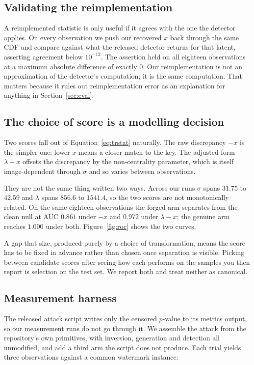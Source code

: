 \documentclass[10pt,twocolumn]{article}
\newcommand{\xstat}{\ensuremath{x}}
\newcommand{\lam}{\ensuremath{\lambda}}
\begin{document}
\subsection{Validating the reimplementation}

A reimplemented statistic is only useful if it agrees with the one the detector
applies. On every observation we push our recovered $\xstat$ back through the same CDF
and compare against what the released detector returns for that latent, asserting
agreement below $10^{-12}$. The assertion held on all eighteen observations at a
maximum absolute difference of exactly $0$. Our reimplementation is not an
approximation of the detector's computation; it is the same computation. That matters
because it rules out reimplementation error as an explanation for anything in
Section~\ref{sec:eval}.

\subsection{The choice of score is a modelling decision}
\label{sec:score}

Two scores fall out of Equation~\ref{eq:trstat} naturally. The raw discrepancy
$-\xstat$ is the simpler one: lower $\xstat$ means a closer match to the key. The
adjusted form $\lam - \xstat$ offsets the discrepancy by the non-centrality parameter,
which is itself image-dependent through $\sigma$ and so varies between observations.

They are not the same thing written two ways. Across our runs $\sigma$ spans $31.75$
to $42.59$ and $\lam$ spans $856.6$ to $1541.4$, so the two scores are not
monotonically related. On the same eighteen observations the forged arm separates from
the clean null at AUC $0.861$ under $-\xstat$ and $0.972$ under $\lam - \xstat$; the
genuine arm reaches $1.000$ under both. Figure~\ref{fig:roc} shows the two curves.

A gap that size, produced purely by a choice of transformation, means the score has to
be fixed in advance rather than chosen once separation is visible. Picking between
candidate scores after seeing how each performs on the samples you then report is
selection on the test set. We report both and treat neither as canonical.

\subsection{Measurement harness}

The released attack script writes only the censored $p$-value to its metrics output,
so our measurement runs do not go through it. We assemble the attack from the
repository's own primitives, with inversion, generation and detection all unmodified,
and add a third arm the script does not produce. Each trial yields three observations
against a common watermark instance:
\end{document}
